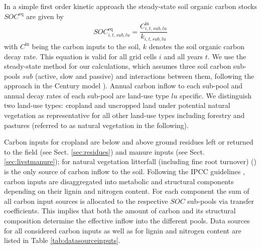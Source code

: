 \documentclass[gc, manuscript]{copernicus}
\begin{document}
In a simple first order kinetic approach the steady-state soil organic carbon stocks \(SOC^{\mathrm{eq}}\) are given by
\begin{equation}
SOC^{\mathrm{eq}}_{i,t,sub,lu} =\frac{C^{\mathrm{in}}_{i,t,sub,lu}}{k_{i,t,sub,lu}}
\label{eq:inoutflow}
\end{equation}
with \(C^{\textrm{in}}\) being the carbon inputs to the soil, \(k\) denotes the soil organic carbon decay rate. This equation is valid for all grid cells \(i\) and all years \(t\). We use the steady-state method for our calculations, which assumes three soil carbon sub-pools \(sub\) (active, slow and passive) and interactions between them, following the approach in the Century model \citep[(][]{parton_analysis_1987}). Annual carbon inflow to each sub-pool and annual decay rates of each sub-pool are land-use type \(lu\) specific.
We distinguish two land-use types: cropland and uncropped land under potential natural vegetation as representative for all other land-use types including forestry and pastures (referred to as natural vegetation in the following).

Carbon inputs for cropland are below and above ground residues left or returned to the field (see Sect. \ref{sec:residues}) and manure inputs (see Sect. \ref{sec:livstmanure}); for natural vegetation litterfall (including fine root turnover) (\citep{schaphoff_lpjml4_2018}) is the only source of carbon inflow to the soil. Following the IPCC guidelines \citep{calvo_buendia_ipcc_2019}, carbon inputs are disaggregated into metabolic and structural components depending on their lignin and nitrogen content. For each component the sum of all carbon input sources is allocated to the respective \(SOC\) sub-pools via transfer coefficients. This implies that both the amount of carbon and its structural composition determine the effective inflow into the different pools. Data sources for all considered carbon inputs as well as for lignin and nitrogen content are listed in Table \ref{tab:datasourceinputs}.
\end{document}
